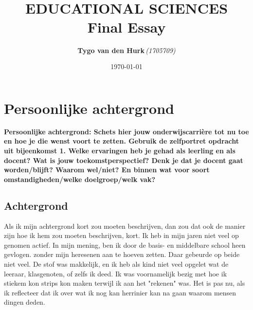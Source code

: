 \documentclass{article}
\title{ 
    \normalsize 
    \textsc{} \\
    [2.0cm]
    \HRule{1.5pt} \\
    \LARGE \textbf{
        \uppercase{Educational sciences}
        \HRule{2.0pt} \\ 
        [0.6cm] 
        \LARGE{Final Essay} 
        \vspace*{10\baselineskip}
    }
}
\date{\today}
\author{
    \textbf{Tygo van den Hurk}\,\orcidlink{0009-0003-4182-5076}\textit{(1705709)}
}
\begin{document}
   

    
    \maketitle
    \thispagestyle{empty}
    \newpage
    
    
    \renewcommand{\contentsname}{Inhoudsopgave}
    \tableofcontents
    \thispagestyle{empty}
    \newpage


    \section{Persoonlijke achtergrond}
        \textbf{Persoonlijke achtergrond: Schets hier jouw onderwijscarrière tot nu toe en hoe je die wenst voort te zetten. Gebruik de zelfportret opdracht uit bijeenkomst 1. Welke ervaringen heb je gehad als leerling en als docent? Wat is jouw toekomstperspectief? Denk je dat je docent gaat worden/blijft? Waarom wel/niet? En binnen wat voor soort omstandigheden/welke doelgroep/welk vak?}
        
        \subsection{Achtergrond}
            Als ik mijn achtergrond kort zou moeten beschrijven, dan zou dat ook de manier zijn hoe ik hem zou moeten beschrijven, kort. Ik heb in mijn jaren niet veel op genomen actief. In mijn mening, ben ik door de basis- en middelbare school heen gevlogen. zonder mijn heresenen aan te hoeven zetten. Daar gebeurde op beide niet veel. De stof was makkelijk, en ik heb als kind niet veel opgelet wat de leeraar, klasgenoten, of zelfs ik deed. Ik was voornamelijk bezig met hoe ik stiekem kon strips kon maken terwijl ik aan het "rekenen" was. Het is pas nu, als ik reflecteer dat ik over wat ik nog kan herrinier kan na gaan waarom mensen dingen deden.
\end{document}
